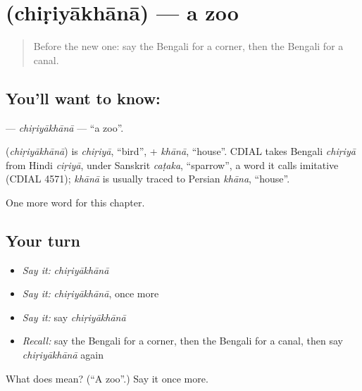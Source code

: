 \section[\texorpdfstring{\bn{চিড়িয়াখানা} (chiṛiyākhānā)}{চিড়িয়াখানা (chiṛiyākhānā)}]{ (chiṛiyākhānā) — a zoo}

\label{lesson:BN-C157-chiriyakhana}



\begin{quote}
Before the new one: say the Bengali for a corner, then the Bengali for a canal.
\end{quote}

\subsection*{You'll want to know: }
\textbf{} — \emph{chiṛiyākhānā} — \textquotedblleft{}a zoo\textquotedblright{}.

\begin{cousinweb}
\textbf{} (\emph{chiṛiyākhānā}) is \emph{chiṛiyā}, \textquotedblleft{}bird\textquotedblright{}, + \emph{khānā}, \textquotedblleft{}house\textquotedblright{}. CDIAL takes Bengali \emph{chiṛiyā} from Hindi \emph{ciṛiyā}, under Sanskrit \emph{caṭaka}, \textquotedblleft{}sparrow\textquotedblright{}, a word it calls imitative (CDIAL 4571); \emph{khānā} is usually traced to Persian \emph{khāna}, \textquotedblleft{}house\textquotedblright{}.
\end{cousinweb}

\begin{grammarlens}[title={What you've built}]
One more word for this chapter.
\end{grammarlens}

\subsection*{Your turn}
\begin{itemize}
\raggedright
  \item \emph{Say it:} \emph{chiṛiyākhānā}
  \item \emph{Say it:} \emph{chiṛiyākhānā}, once more
  \item \emph{Say it:} say \emph{chiṛiyākhānā}
  \item \emph{Recall:} say the Bengali for a corner, then the Bengali for a canal, then say \emph{chiṛiyākhānā} again
\end{itemize}

\begin{tcolorbox}[breakable,colback=teal!4,colframe=teal!35!black,title={Before you move on}]
What does  mean? (\textquotedblleft{}A zoo\textquotedblright{}.) Say it once more.
\end{tcolorbox}
